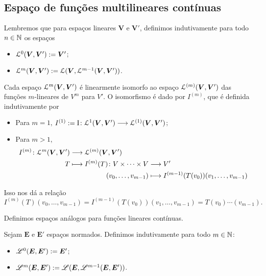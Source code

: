 

\subsection{Espaço de funções multilineares contínuas}

Lembremos que para espaços lineares $\bm V$ e $\bm V'$, definimos indutivamente para todo $n \in \mathbb{N}$ os espaços
	\begin{itemize}
	\item $\mathcal{L}^0(\bm V, \bm V') := \bm V'$;
	\item $\mathcal{L}^m(\bm V, \bm V') := \mathcal{L}(\bm V, \mathcal{L}^{m-1}(\bm V, \bm V'))$.
	\end{itemize}
Cada espaço $\mathcal{L}^m(\bm V, \bm V')$ é linearmente isomorfo ao espaço $\mathcal{L}^{(m)}(\bm V, \bm V')$ das funções $m$-lineares de $V^m$ para $V'$. O isomorfismo é dado por $I^{(m)}$, que é definida indutivamente por
	\begin{itemize}
	\item Para $m=1$, $I^{(1)} := {\mathrm{I}}\colon {\mathcal{L}^1(\bm V, \bm V')} \longrightarrow {\mathcal{L}^{(1)}(\bm V, \bm V')}$;
	\item Para $m>1$,
		\begin{align*}
		\func{I^{(m)}}{\lin^m(\bm V, \bm V')}{\lin^{(m)}(\bm V, \bm V')}{T}{
			\begin{aligned}[t]
			\func{I^{(m)}(T)}{V \times \cdots \times V}{V'}{(v_0,\ldots, v_{m-1})}{I^{(m-1)}(T(v_0))(v_1,\ldots, v_{m-1})}
			\end{aligned}
		}
		\end{align*}
	\end{itemize}

Isso nos dá a relação
	\begin{equation*}
	I^{(m)}(T)(v_0, \ldots, v_{m-1}) = I^{(m-1)}(T(v_0))(v_1,\ldots, v_{m-1}) = T(v_0)\cdots(v_{m-1}).
	\end{equation*}

Definimos espaços análogos para funções lineares contínuas.

\begin{definition}
Sejam $\bm E$ e $\bm E'$ espaços normados. Definimos indutivamente para todo $m \in \mathbb{N}$:
	\begin{itemize}
	\item $\mathscr{L}^0(\bm E, \bm E') := \bm E'$;
	\item $\mathscr{L}^m(\bm E, \bm E') := \mathscr{L}(\bm E, \mathscr{L}^{m-1}(\bm E, \bm E'))$.
	\end{itemize}
\end{definition}

